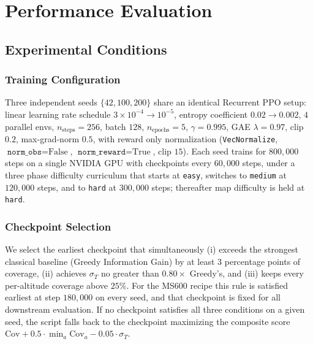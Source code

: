 \documentclass[conference]{IEEEtran}
\begin{document}
\section{Performance Evaluation}

\subsection{Experimental Conditions}

\subsubsection{Training Configuration}
Three independent seeds $\{42,100,200\}$ share an identical Recurrent PPO setup: linear learning rate schedule $3{\times}10^{-4}\!\to\!10^{-5}$, entropy coefficient $0.02\!\to\!0.002$, $4$ parallel envs, $n_{\text{steps}}{=}256$, batch $128$, $n_{\text{epochs}}{=}5$, $\gamma{=}0.995$, GAE $\lambda{=}0.97$, clip $0.2$, max-grad-norm $0.5$, with reward only normalization (\texttt{VecNormalize}, $\texttt{norm\_obs}\!=\!\text{False}$, $\texttt{norm\_reward}\!=\!\text{True}$, clip $15$). Each seed trains for $800{,}000$ steps on a single NVIDIA GPU with checkpoints every $60{,}000$ steps, under a three phase difficulty curriculum that starts at \texttt{easy}, switches to \texttt{medium} at $120{,}000$ steps, and to \texttt{hard} at $300{,}000$ steps; thereafter map difficulty is held at \texttt{hard}.

\subsubsection{Checkpoint Selection}
We select the earliest checkpoint that simultaneously (i) exceeds the strongest classical baseline (Greedy Information Gain) by at least $3$ percentage points of coverage, (ii) achieves $\sigma_T$ no greater than $0.80\!\times\!$ Greedy's, and (iii) keeps every per-altitude coverage above $25\%$. For the MS600 recipe this rule is satisfied earliest at step $180{,}000$ on every seed, and that checkpoint is fixed for all downstream evaluation. If no checkpoint satisfies all three conditions on a given seed, the script falls back to the checkpoint maximizing the composite score $\mathrm{Cov}+0.5\!\cdot\!\min_a\mathrm{Cov}_a-0.05\!\cdot\!\sigma_T$.
\end{document}
